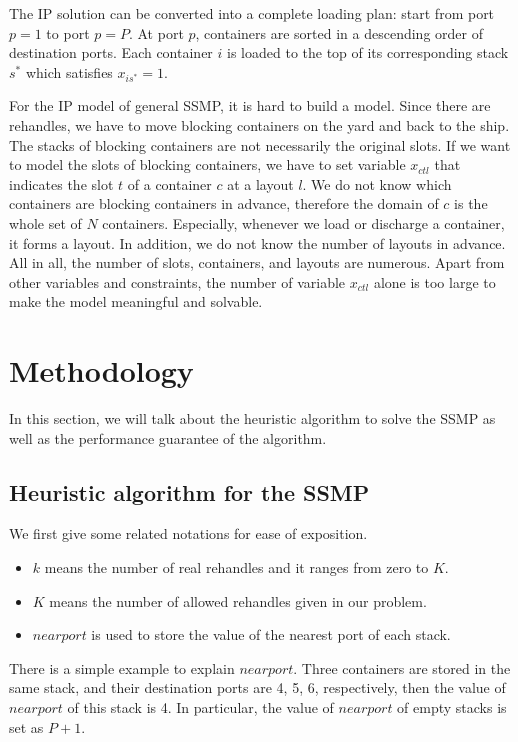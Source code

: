 \documentclass[review,3p,times,authoryear,12pt]{elsarticle}
\begin{document}
The IP solution can be converted into a complete loading plan: start from port $p=1$ to port $p=P$. At port $p$, containers are sorted in a descending order of destination ports. Each container $i$ is loaded to the top of its corresponding stack $s^*$ which satisfies $x_{is^*}=1$.

For the IP model of general SSMP, it is hard to build a model.
Since there are rehandles, we have to move blocking containers on the yard and back to the ship.
The stacks of blocking containers are not necessarily the original slots.
If we want to model the slots of blocking containers, we have to set variable $x_{ctl}$ that indicates the slot $t$ of a container $c$ at a layout $l$.
We do not know which containers are blocking containers in advance, therefore the domain of $c$ is the whole set of $N$ containers.
Especially, whenever we load or discharge a container, it forms a layout.
In addition, we do not know the number of layouts in advance.
All in all, the number of slots, containers, and layouts are numerous. Apart from other variables and constraints, the number of variable $x_{ctl}$ alone is too large to make the model meaningful and solvable.

\section{Methodology}
\label{sec:algo}
In this section, we will talk about the heuristic algorithm to solve the SSMP as well as the performance guarantee of the algorithm.

\subsection{Heuristic algorithm for the SSMP}
\label{sec:h1}
We first give some related notations for ease of exposition.

\begin{itemize}
\item $k$ means the number of real rehandles and it ranges from zero to $K$.
\item $K$ means the number of allowed rehandles given in our problem.
\item $nearport$ is used to store the value of the nearest port of each stack.
\end{itemize}

There is a simple example to explain $nearport$. Three containers are stored in the same stack, and their destination ports are 4, 5, 6, respectively, then the value of $nearport$ of this stack is 4.
In particular, the value of $nearport$ of empty stacks is set as $P+1$.
\end{document}
